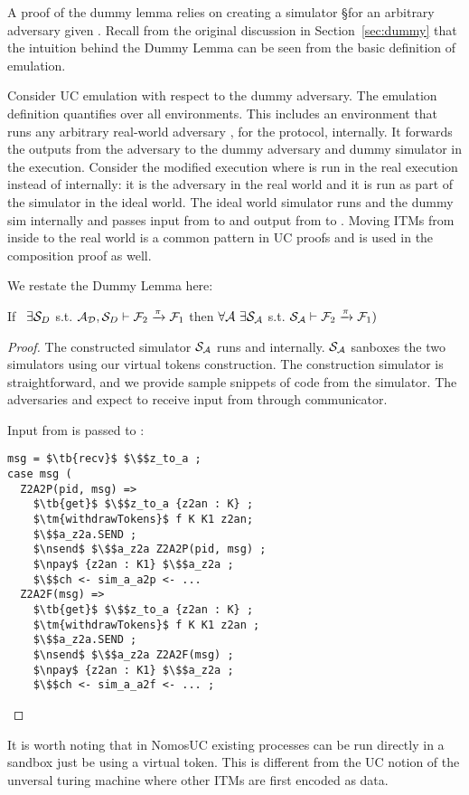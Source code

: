 A proof of the dummy lemma relies on creating a simulator \S for an arbitrary adversary given \DS.
Recall from the original discussion in Section~\ref{sec:dummy} that the intuition behind the Dummy Lemma can be seen from the basic definition of emulation.

Consider UC emulation with respect to the dummy adversary. The emulation definition quantifies over all environments. 
This includes an environment that runs any arbitrary real-world adversary \A, for the protocol, internally. 
It forwards the outputs from the adversary to the dummy adversary and dummy simulator in the execution.
Consider the modified execution where \A is run in the real execution instead of internally: it is the adversary in the real world and it is run as part of the simulator in the ideal world.
The ideal world simulator runs \A and the dummy sim internally and passes input from \Z to \A and output from \A to \DS.
Moving ITMs from inside \Z to the real world is a common pattern in UC proofs and is used in the composition proof as well.

We restate the Dummy Lemma here:
\begin{theorem}\label{thm:dummy}
If \ $\exists \mathcal{S}_{D}$ s.t. $ \mathcal{A}_\mathcal{D}, \mathcal{S}_{D} \vdash \mathcal{F}_2 \xrightarrow{\pi} \mathcal{F}_1$ then $\forall \mathcal{A} \ \exists \mathcal{S}_\mathcal{A}$ s.t. $\mathcal{S}_{\mathcal{A}} \vdash  \mathcal{F}_2 \xrightarrow{\pi} \mathcal{F}_1)$ 
\end{theorem}

\begin{proof}
The constructed simulator $\mathcal{S}_\mathcal{A}$ runs \A and \DS internally.
$\mathcal{S}_\mathcal{A}$ sanboxes the two simulators using our virtual tokens construction.
The construction simulator is straightforward, and we provide sample snippets of code from the simulator.
The adversaries \A and \DS expect to receive input from \Z through communicator.

Input from \Z is passed to \A:
\begin{lstlisting}[basicstyle=\footnotesize\BeraMonottFamily, frame=single,  mathescape]
msg = $\tb{recv}$ $\$$z_to_a ;
case msg (
  Z2A2P(pid, msg) =>
    $\tb{get}$ $\$$z_to_a {z2an : K} ;
    $\tm{withdrawTokens}$ f K K1 z2an;
    $\$$a_z2a.SEND ;
    $\nsend$ $\$$a_z2a Z2A2P(pid, msg) ;
    $\npay$ {z2an : K1} $\$$a_z2a ;
    $\$$ch <- sim_a_a2p <- ... 
  Z2A2F(msg) =>
    $\tb{get}$ $\$$z_to_a {z2an : K} ;
    $\tm{withdrawTokens}$ f K K1 z2an ;
    $\$$a_z2a.SEND ;
    $\nsend$ $\$$a_z2a Z2A2F(msg) ;
    $\npay$ {z2an : K1} $\$$a_z2a ;
    $\$$ch <- sim_a_a2f <- ... ;
\end{lstlisting}
\end{proof}
It is worth noting that in NomosUC existing processes can be run directly in a sandbox just be using a virtual token.
This is different from the UC notion of the unversal turing machine where other ITMs are first encoded as data.

